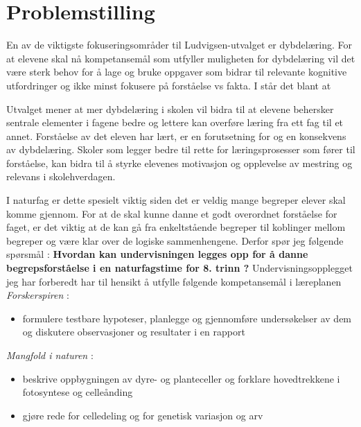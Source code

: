 \documentclass[main.tex]{subfiles}
\begin{document}
\section*{Problemstilling}
En av de viktigste fokuseringsområder til Ludvigsen-utvalget er dybdelæring. For at elevene
skal nå kompetansemål som utfyller muligheten for dybdelæring vil det være sterk behov for å lage og bruke 
oppgaver som bidrar til relevante kognitive utfordringer og ikke minst fokusere på forståelse vs fakta. 
I  står det blant at

\begin{displayquote}
Utvalget mener at mer dybdelæring i skolen vil bidra til at elevene behersker sentrale elementer
i fagene bedre og lettere kan overføre læring fra ett fag til et annet. Forståelse av det eleven har
lært, er en forutsetning for og en konsekvens av dybdelæring. Skoler som legger bedre til rette for
læringsprosesser som fører til forståelse, kan bidra til å styrke elevenes motivasjon og opplevelse
av mestring og relevans i skolehverdagen.
\end{displayquote}
I naturfag er dette spesielt viktig siden det er veldig mange begreper elever skal komme gjennom. For at de skal
kunne danne et godt overordnet forståelse for faget, er det viktig at de kan gå fra enkeltstående begreper til 
koblinger mellom begreper og være klar over de logiske sammenhengene. Derfor spør jeg følgende spørsmål :
\newline
\newline
\textbf{Hvordan kan undervisningen legges opp for å danne begrepsforståelse i en naturfagstime for 8. trinn ?}
\newline
\newline
Undervisningsopplegget jeg har forberedt har til hensikt å utfylle følgende kompetansemål  i læreplanen
\newline
\newline
\emph{Forskerspiren} :
\begin{itemize}
\vspace{-2mm}
\item formulere testbare hypoteser, planlegge og gjennomføre undersøkelser 
av dem og diskutere observasjoner og resultater i en rapport
\end{itemize}
\emph{Mangfold i naturen} :
\begin{itemize}
\vspace{-2mm}
\item beskrive oppbygningen av dyre- og planteceller og forklare hovedtrekkene i fotosyntese 
og celleånding
\vspace{-3mm}
\item gjøre rede for celledeling og for genetisk variasjon og arv
\end{itemize}
\end{document}
